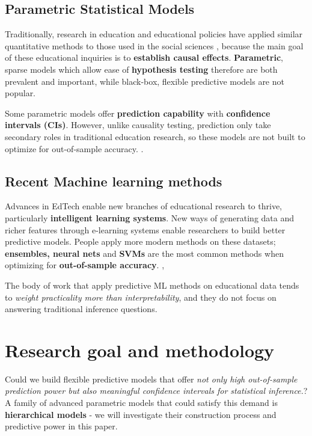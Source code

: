 \documentclass{sigchi}
\begin{document}
\subsection{Parametric Statistical Models}
Traditionally, research in education and educational
policies have applied similar quantitative methods to those used in the social sciences
\cite{gelman2009quantitative}, because the main goal of these
educational inquiries is to \textbf{establish causal effects}. \textbf{Parametric}, sparse models which allow ease of \textbf{hypothesis testing}
therefore are both prevalent and important, while black-box,
flexible predictive models are not popular. \cite{teo2014handbook}

Some parametric models offer \textbf{prediction capability} with 
\textbf{confidence intervals (CIs)}. However, unlike causality testing, prediction only take secondary roles in traditional education research,
so these models are not built to optimize for out-of-sample accuracy. \cite{romero2010educational}.

\subsection{Recent Machine learning methods}
Advances in EdTech enable new
branches of educational research to thrive, particularly \textbf{intelligent learning systems}. \cite{romero2010educational}
New ways of generating data and richer features through e-learning systems enable researchers to build better predictive models. People apply more modern methods on these datasets;
\textbf{ensembles, neural nets} and \textbf{SVMs} are the most common methods
when optimizing for \textbf{out-of-sample accuracy}. \cite{shahiri2015review}, \cite{amrieh2016mining} 

The body of work that apply predictive ML methods
on educational data tends to \textit{weight practicality more than interpretability}, and
they do not focus on answering traditional inference questions. \cite{romero2010educational, meier2016predicting}

\section{Research goal and methodology}
Could we build flexible predictive models
that offer \textit{not only high out-of-sample prediction
  power but also meaningful confidence intervals for statistical
  inference.}? A family of advanced parametric models that could satisfy this
demand is \textbf{hierarchical models} - we will investigate their construction
process and predictive power in this paper.
\end{document}
